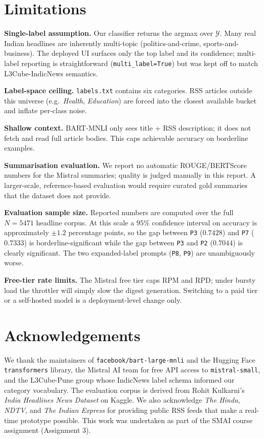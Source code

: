 \documentclass[10pt,twocolumn,letterpaper]{article}
\begin{document}
\section{Limitations}
\label{sec:limitations}
\textbf{Single-label assumption.} Our classifier returns the argmax over $\mathcal{Y}$. Many real Indian headlines are inherently multi-topic (politics-and-crime, sports-and-business). The deployed UI surfaces only the top label and its confidence; multi-label reporting is straightforward (\texttt{multi\_label=True}) but was kept off to match L3Cube-IndicNews semantics.

\noindent\textbf{Label-space ceiling.} \texttt{labels.txt} contains six categories. RSS articles outside this universe (e.g.\ \textit{Health}, \textit{Education}) are forced into the closest available bucket and inflate per-class noise.

\noindent\textbf{Shallow context.} BART-MNLI only sees title + RSS description; it does not fetch and read full article bodies. This caps achievable accuracy on borderline examples.

\noindent\textbf{Summarisation evaluation.} We report no automatic ROUGE/BERTScore numbers for the Mistral summaries; quality is judged manually in this report. A larger-scale, reference-based evaluation would require curated gold summaries that the dataset does not provide.

\noindent\textbf{Evaluation sample size.} Reported numbers are computed over the full $N{=}5471$ headline corpus. At this scale a $95\%$ confidence interval on accuracy is approximately $\pm 1.2$ percentage points, so the gap between \texttt{P3} ($0.7428$) and \texttt{P7} ($0.7333$) is borderline-significant while the gap between \texttt{P3} and \texttt{P2} ($0.7044$) is clearly significant. The two expanded-label prompts (\texttt{P8}, \texttt{P9}) are unambiguously worse.

\noindent\textbf{Free-tier rate limits.} The Mistral free tier caps RPM and RPD; under bursty load the throttler will simply slow the digest generation. Switching to a paid tier or a self-hosted model is a deployment-level change only.

\section{Acknowledgements}
\label{sec:ack}
We thank the maintainers of \texttt{facebook/bart-large-mnli} and the Hugging Face \texttt{transformers} library, the Mistral AI team for free API access to \texttt{mistral-small}, and the L3Cube-Pune group whose IndicNews label schema informed our category vocabulary. The evaluation corpus is derived from Rohit Kulkarni's \textit{India Headlines News Dataset} on Kaggle. We also acknowledge \textit{The Hindu}, \textit{NDTV}, and \textit{The Indian Express} for providing public RSS feeds that make a real-time prototype possible. This work was undertaken as part of the SMAI course assignment (Assignment 3).
\end{document}
